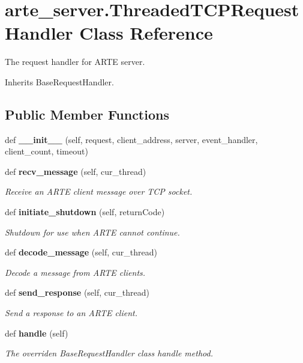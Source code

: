 \section{arte\+\_\+server.\+Threaded\+T\+C\+P\+Request\+Handler Class Reference}
\label{classarte__server_1_1_threaded_t_c_p_request_handler}


The request handler for A\+R\+TE server.  




Inherits Base\+Request\+Handler.

\subsection*{Public Member Functions}
\begin{DoxyCompactItemize}
\item 
def {\bfseries \+\_\+\+\_\+init\+\_\+\+\_\+} (self, request, client\+\_\+address, server, event\+\_\+handler, client\+\_\+count, timeout)\label{classarte__server_1_1_threaded_t_c_p_request_handler_a58e2fb224abf19b7e83e2380b8c10d60}

\item 
def {\bf recv\+\_\+message} (self, cur\+\_\+thread)
\begin{DoxyCompactList}\small\item\em Receive an A\+R\+TE client message over T\+CP socket. \end{DoxyCompactList}\item 
def {\bf initiate\+\_\+shutdown} (self, return\+Code)
\begin{DoxyCompactList}\small\item\em Shutdown for use when A\+R\+TE cannot continue. \end{DoxyCompactList}\item 
def {\bf decode\+\_\+message} (self, cur\+\_\+thread)
\begin{DoxyCompactList}\small\item\em Decode a message from A\+R\+TE clients. \end{DoxyCompactList}\item 
def {\bf send\+\_\+response} (self, cur\+\_\+thread)
\begin{DoxyCompactList}\small\item\em Send a response to an A\+R\+TE client. \end{DoxyCompactList}\item 
def {\bf handle} (self)
\begin{DoxyCompactList}\small\item\em The overriden Base\+Request\+Handler class handle method. \end{DoxyCompactList}\end{DoxyCompactItemize}
